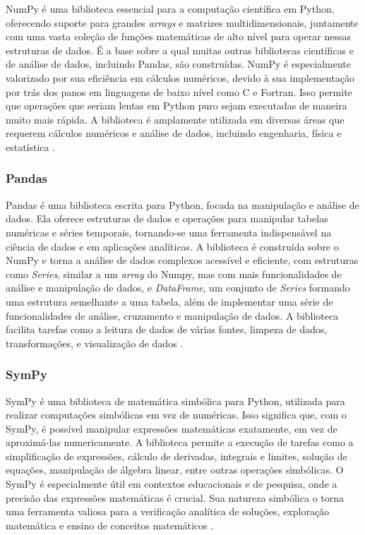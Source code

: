 NumPy é uma biblioteca essencial para a computação científica em Python, oferecendo suporte para grandes \textit{arrays} e
matrizes multidimensionais, juntamente com uma vasta coleção de funções matemáticas de alto nível para operar nessas
estruturas de dados.
É a base sobre a qual muitas outras bibliotecas científicas e de análise de dados, incluindo Pandas, são construídas.
NumPy é especialmente valorizado por sua eficiência em cálculos numéricos, devido à sua implementação por trás dos panos
em linguagens de baixo nível como C e Fortran.
Isso permite que operações que seriam lentas em Python puro sejam executadas de maneira muito mais rápida.
A biblioteca é amplamente utilizada em diversas áreas que requerem cálculos numéricos e análise de dados, incluindo
engenharia, física e estatística \cite{numpy}.

\subsubsection{Pandas}

Pandas é uma biblioteca escrita para Python, focada na manipulação e análise de dados.
Ela oferece estruturas de dados e operações para manipular tabelas numéricas e séries temporais, tornando-se uma
ferramenta indispensável na ciência de dados e em aplicações analíticas.
A biblioteca é construída sobre o NumPy e torna a análise de dados complexos acessível e eficiente, com estruturas como
\textit{Series}, similar a um \textit{array} do Numpy, mas com mais funcionalidades de análise e manipulação de dados, e
\textit{DataFrame}, um conjunto de \textit{Series} formando uma estrutura semelhante a uma tabela, além de implementar
uma série de funcionalidades de análise, cruzamento e manipulação de dados.
A biblioteca facilita tarefas como a leitura de dados de várias fontes, limpeza de dados, transformações, e visualização
de dados \cite{pandas}.

\subsubsection{SymPy}

SymPy é uma biblioteca de matemática simbólica para Python, utilizada para realizar computações simbólicas em vez de
numéricas.
Isso significa que, com o SymPy, é possível manipular expressões matemáticas exatamente, em vez de aproximá-las
numericamente.
A biblioteca permite a execução de tarefas como a simplificação de expressões, cálculo de derivadas, integrais e
limites, solução de equações, manipulação de álgebra linear, entre outras operações simbólicas.
O SymPy é especialmente útil em contextos educacionais e de pesquisa, onde a precisão das expressões matemáticas é
crucial.
Sua natureza simbólica o torna uma ferramenta valiosa para a verificação analítica de soluções, exploração matemática e
ensino de conceitos matemáticos \cite{sympy}.

